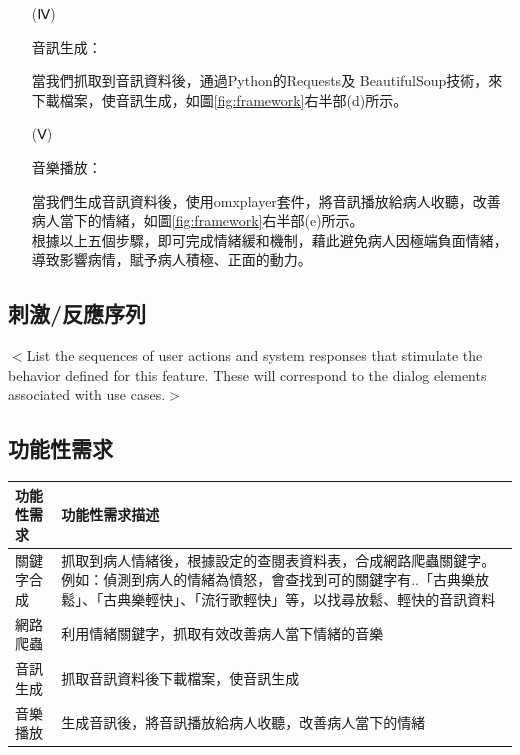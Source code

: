 \documentclass[12pt]{scrreprt}
\begin{document}
\begin{itemize}
\item[(Ⅳ)]{\begin{bfseries}{音訊生成：}\end{bfseries}}

當我們抓取到音訊資料後，通過Python的Requests及 BeautifulSoup技術，來下載檔案，使音訊生成，如圖\ref{fig:framework}右半部(d)所示。\\

\item[(Ⅴ)]{\begin{bfseries}{音樂播放：}\end{bfseries}}

當我們生成音訊資料後，使用omxplayer套件，將音訊播放給病人收聽，改善病人當下的情緒，如圖\ref{fig:framework}右半部(e)所示。\\

根據以上五個步驟，即可完成情緒緩和機制，藉此避免病人因極端負面情緒，導致影響病情，賦予病人積極、正面的動力。\\

\end{itemize}

\subsection{刺激/反應序列}
$<$List the sequences of user actions and system responses that stimulate the 
behavior defined for this feature. These will correspond to the dialog elements 
associated with use cases.$>$

\subsection{功能性需求}

\begin{center}  
\begin{tabular}{|l| p{10cm}|}  
\hline  
功能性需求 & 功能性需求描述   \\ \hline  
關鍵字合成 & 抓取到病人情緒後，根據設定的查閱表資料表，合成網路爬蟲關鍵字。例如：偵測到病人的情緒為憤怒，會查找到可的關鍵字有..「古典樂放鬆」、「古典樂輕快」、「流行歌輕快」等，以找尋放鬆、輕快的音訊資料    \\ \hline  
網路爬蟲 & 利用情緒關鍵字，抓取有效改善病人當下情緒的音樂 \\ \hline
音訊生成 & 抓取音訊資料後下載檔案，使音訊生成 \\ \hline
音樂播放 & 生成音訊後，將音訊播放給病人收聽，改善病人當下的情緒 \\ \hline

\end{tabular}  
\end{center}  
\end{document}
